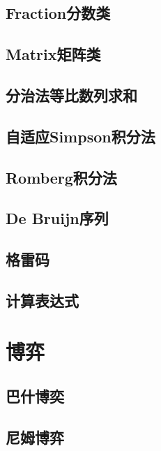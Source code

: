 \documentclass[a4paper, 12pt, twoside]{article}
\begin{document}
\subsection{Fraction分数类}

\subsection{Matrix矩阵类}

\subsection{分治法等比数列求和}

\subsection{自适应Simpson积分法}

\subsection{Romberg积分法}

\subsection{De Bruijn序列}

\subsection{格雷码}

\subsection{计算表达式}


\section{博弈}
\subsection{巴什博奕}

\subsection{尼姆博弈}

\end{document}
